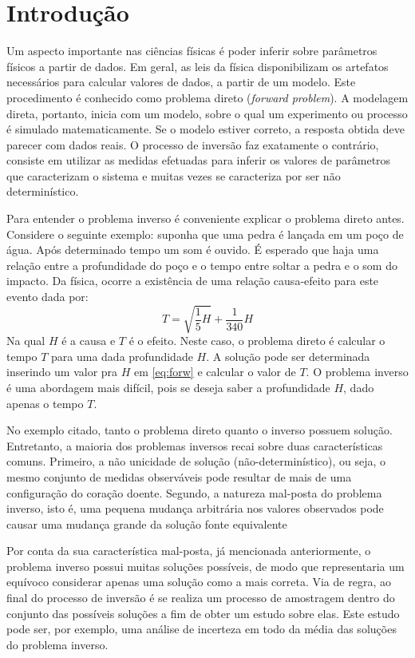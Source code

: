 \chapter{Introdução}
\label{cap:1intro}

Um aspecto importante nas ciências físicas é poder inferir sobre parâmetros
físicos a partir de dados. Em geral, as leis da física disponibilizam os
artefatos necessários para calcular valores de dados, a partir de um modelo.
Este procedimento é conhecido como problema direto (\textit{forward problem}).
A modelagem direta, portanto, inicia com um modelo, sobre o qual um experimento ou processo
é simulado matematicamente. Se o modelo estiver correto, a resposta
obtida deve parecer com dados reais. O processo de inversão faz exatamente o contrário,
consiste em utilizar as medidas efetuadas para inferir os valores de parâmetros que
caracterizam o sistema \citep{tarantola} e muitas vezes se caracteriza
por ser não determinístico.

Para entender o problema inverso é conveniente explicar o problema direto antes.
Considere o seguinte exemplo: suponha que uma pedra é lançada em um poço de água.
Após determinado tempo um som é ouvido. É esperado que haja uma relação entre a
profundidade do poço e o tempo entre soltar a pedra e o som do impacto. Da física,
ocorre a existência de uma relação causa-efeito para este evento dada por:
\begin{equation}
\label{eq:forw}
T = \sqrt{\frac{1}{5}H} + \frac{1}{340}H
\end{equation}
Na qual $H$ é a causa e $T$ é o efeito.
Neste caso, o problema direto é calcular o tempo $T$ para uma dada profundidade $H$.
A solução pode ser determinada inserindo um valor pra $H$ em \ref{eq:forw} e calcular o
valor de $T$. O problema inverso é uma abordagem mais difícil, pois se deseja
saber a profundidade $H$, dado apenas o tempo $T$.

No exemplo citado, tanto o problema direto quanto o inverso possuem solução. Entretanto,
a maioria dos problemas inversos recai sobre duas características
comuns. Primeiro, a não unicidade de solução (não-determinístico), ou seja, o mesmo conjunto de medidas
observáveis pode resultar de mais de uma configuração do coração doente. Segundo,
a natureza mal-posta do problema inverso, isto é, uma pequena mudança arbitrária nos
valores observados pode causar uma mudança grande da solução fonte equivalente

Por conta da sua característica mal-posta, já mencionada anteriormente, o problema inverso
possui muitas soluções possíveis, de modo que representaria um equívoco considerar apenas
uma solução como a mais correta. Via de regra, ao final do processo de inversão é
se realiza um processo de amostragem dentro do conjunto das possíveis soluções a fim
de obter um estudo sobre elas. Este estudo pode ser, por exemplo, uma análise de 
incerteza em todo da média das soluções do problema inverso.


